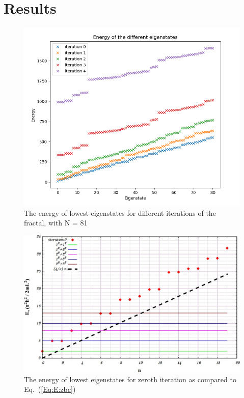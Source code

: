 \documentclass[aps,prl,reprint,onecolumn,superscriptaddress,floatfix,longbibliography]{revtex4-2}
\begin{document}
%

\section{Results}

\begin{figure}[h!]
    \centering
    \includegraphics[scale=0.5]{./images/energy_eigenstates.png}
    \caption{The energy of lowest eigenstates for different iterations of the fractal, with N = 81}
    \label{figure:IPR}
\end{figure}

\begin{figure}[h!]
    \centering
    \includegraphics[scale=0.5]{./images/FigEiter0.jpg}
    \caption{The energy of lowest eigenstates for zeroth iteration as compared to Eq.~(\ref{Eq:E:zbc})}
    \label{figure:IPR}
\end{figure}
\end{document}

